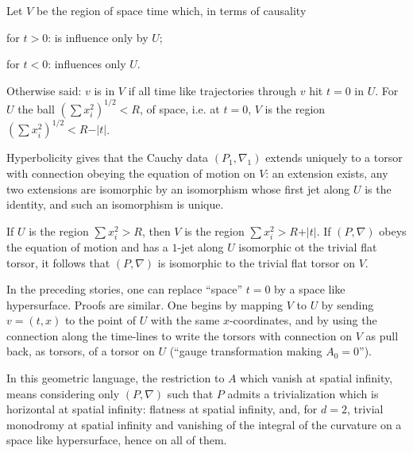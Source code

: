 Let $V$ be the region of space time which, in terms of
causality

\item{} for $t>0$: is influence only by $U$;

\item{} for $t<0$: influences only $U$.

\noindent
Otherwise said: $v$ is in $V$ if all time like
trajectories through $v$ hit $t=0$ in $U$.
For $U$ the ball $\left(\sum x_i^2\right)^{1/2}<R$, of space,
i.e. at $t=0$, $V$ is the region $\left(\sum
x_i^2\right)^{1/2}<R-\vert t\vert$.

Hyperbolicity gives that the Cauchy data
$(P_1,\nabla_1)$ extends uniquely to a torsor with
connection obeying the equation of motion on $V$:
an extension exists, any two extensions are isomorphic
by an isomorphism whose first jet along $U$ is the
identity, and such an isomorphism is unique.

If $U$ is the region $\sum x_i^2>R$, then $V$ is the
region $\sum x_i^2>R+\vert t\vert$.
If $(P,\nabla)$ obeys the equation of motion and has a
$1$-jet along $U$ isomorphic ot the trivial flat torsor,
it follows that $(P,\nabla)$ is isomorphic to the
trivial flat torsor on $V$.

In the preceding stories, one can replace ``space''
$t=0$ by a space like hypersurface.
Proofs are similar.
One begins by mapping $V$ to $U$ by sending $v=(t,x)$ to
the point of $U$ with the same $x$-coordinates, and by
using the connection along the time-lines to write the
torsors with connection on $V$ as pull back, as torsors,
of a torsor on $U$ (``gauge transformation making
$A_0=0$'').

In this geometric language, the restriction to $A$ which
vanish at spatial infinity, means considering only
$(P,\nabla)$ such that $P$ admits a trivialization which
is horizontal at spatial infinity: flatness at spatial
infinity, and, for $d=2$, trivial monodromy at spatial
infinity and vanishing of the integral of the curvature
on a space like hypersurface, hence on all of them.
\endexample


\enddocument




